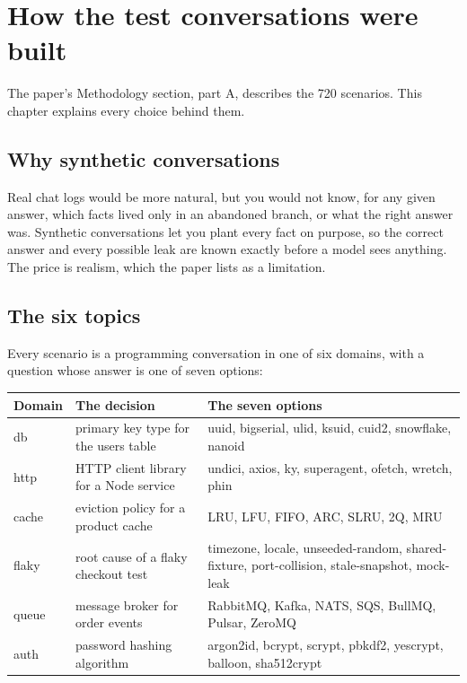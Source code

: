 \chapter{How the test conversations were built}

The paper's Methodology section, part A, describes the 720 scenarios. This chapter explains every choice behind them.

\section{Why synthetic conversations}

\begin{why}
Real chat logs would be more natural, but you would not know, for any given answer, which facts lived only in an abandoned branch, or what the right answer was. Synthetic conversations let you plant every fact on purpose, so the correct answer and every possible leak are known exactly before a model sees anything. The price is realism, which the paper lists as a limitation.
\end{why}

\section{The six topics}

Every scenario is a programming conversation in one of six domains, with a question whose answer is one of seven options:

\begin{center}
\small
\begin{tabularx}{\textwidth}{@{}lXX@{}}
\toprule
Domain & The decision & The seven options \\
\midrule
db & primary key type for the users table & uuid, bigserial, ulid, ksuid, cuid2, snowflake, nanoid \\
http & HTTP client library for a Node service & undici, axios, ky, superagent, ofetch, wretch, phin \\
cache & eviction policy for a product cache & LRU, LFU, FIFO, ARC, SLRU, 2Q, MRU \\
flaky & root cause of a flaky checkout test & timezone, locale, unseeded-random, shared-fixture, port-collision, stale-snapshot, mock-leak \\
queue & message broker for order events & RabbitMQ, Kafka, NATS, SQS, BullMQ, Pulsar, ZeroMQ \\
auth & password hashing algorithm & argon2id, bcrypt, scrypt, pbkdf2, yescrypt, balloon, sha512crypt \\
\bottomrule
\end{tabularx}
\end{center}


